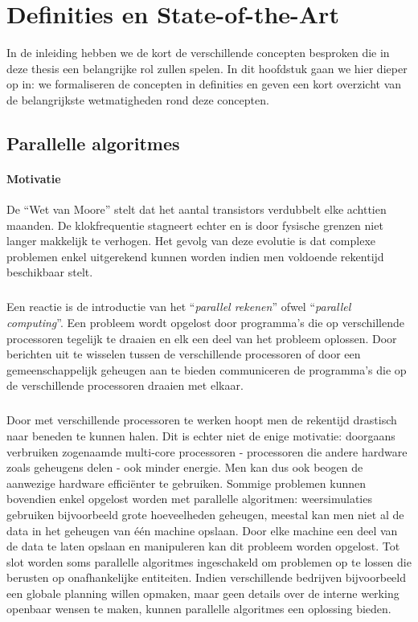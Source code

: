 \chapter{Definities en State-of-the-Art}
\label{hoofdstuk:1}

In de inleiding hebben we de kort de verschillende concepten besproken die in deze thesis een belangrijke rol zullen spelen. In dit hoofdstuk gaan we hier dieper op in: we formaliseren de concepten in definities en geven een kort overzicht van de belangrijkste wetmatigheden rond deze concepten.

\section{Parallelle algoritmes}

\subsubsection{Motivatie}

De ``Wet van Moore''\cite{4785860} stelt dat het aantal transistors verdubbelt elke achttien maanden. De klokfrequentie stagneert echter en is door fysische grenzen niet langer makkelijk te verhogen. Het gevolg van deze evolutie is dat complexe problemen enkel uitgerekend kunnen worden indien men voldoende rekentijd beschikbaar stelt.

\paragraph{}
Een reactie is de introductie van het ``\emph{parallel rekenen}'' ofwel ``\emph{parallel computing}''. Een probleem wordt opgelost door programma's die op verschillende processoren tegelijk te draaien en elk een deel van het probleem oplossen. Door berichten uit te wisselen tussen de verschillende processoren of door een gemeenschappelijk geheugen aan te bieden communiceren de programma's die op de verschillende processoren draaien met elkaar.

\paragraph{}
Door met verschillende processoren te werken hoopt men de rekentijd drastisch naar beneden te kunnen halen. Dit is echter niet de enige motivatie: doorgaans verbruiken zogenaamde multi-core processoren - processoren die andere hardware zoals geheugens delen - ook minder energie. Men kan dus ook beogen de aanwezige hardware effici\"enter te gebruiken. Sommige problemen kunnen bovendien enkel opgelost worden met parallelle algoritmen: weersimulaties gebruiken bijvoorbeeld grote hoeveelheden geheugen, meestal kan men niet al de data in het geheugen van \'e\'en machine opslaan. Door elke machine een deel van de data te laten opslaan en manipuleren kan dit probleem worden opgelost. Tot slot worden soms parallelle algoritmes ingeschakeld om problemen op te lossen die berusten op onafhankelijke entiteiten. Indien verschillende bedrijven bijvoorbeeld een globale planning willen opmaken, maar geen details over de interne werking openbaar wensen te maken, kunnen parallelle algoritmes een oplossing bieden.

